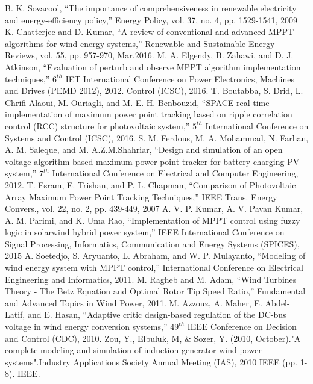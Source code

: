\begin{thebibliography}{}
B. K. Sovacool, “The importance of comprehensiveness in renewable electricity and energy-efficiency policy,” Energy Policy, vol. 37, no. 4, pp. 1529-1541, 2009
K. Chatterjee and D. Kumar, “A review of conventional and advanced MPPT algorithms for wind energy systems,” Renewable and Sustainable Energy Reviews, vol. 55, pp. 957-970, Mar.2016.
M. A. Elgendy, B. Zahawi, and D. J. Atkinson, “Evaluation of perturb and observe MPPT algorithm implementation techniques,” $6^{th}$ IET International Conference on Power Electronics, Machines and Drives (PEMD 2012), 2012. Control (ICSC), 2016.
T. Boutabba, S. Drid, L. Chrifi-Alaoui, M. Ouriagli, and M. E. H. Benbouzid, “SPACE real-time implementation of maximum power point tracking based on ripple correlation control (RCC) structure for photovoltaic system,”  $5^{th}$ International Conference on Systems and Control (ICSC), 2016.
S. M. Ferdous, M. A. Mohammad, N. Farhan, A. M. Saleque, and M. A.Z.M.Shahriar, “Design and simulation of an open voltage algorithm based maximum power point tracker for battery charging PV system,”  $7^{th}$ International Conference on Electrical and Computer Engineering, 2012.
T. Esram, E. Trishan, and P. L. Chapman, “Comparison of Photovoltaic Array Maximum Power Point Tracking Techniques,” IEEE Trans. Energy Convers., vol. 22, no. 2, pp. 439-449, 2007
A. V. P. Kumar, A. V. Pavan Kumar, A. M. Parimi, and K. Uma Rao, “Implementation of MPPT control using fuzzy logic in solarwind hybrid power system,” IEEE International Conference on Signal Processing, Informatics, Communication and Energy Systems (SPICES), 2015 
A. Soetedjo, S. Aryuanto, L. Abraham, and W. P. Mulayanto, “Modeling of wind energy system with MPPT control,”  International Conference on Electrical Engineering and Informatics, 2011.
M. Ragheb and M. Adam, “Wind Turbines Theory - The Betz Equation and Optimal Rotor Tip Speed Ratio,” Fundamental and Advanced Topics in Wind Power, 2011. 
M. Azzouz, A. Maher, E. Abdel-Latif, and E. Hasan, “Adaptive critic design-based regulation of the DC-bus voltage in wind energy conversion systems,” $49^{th}$ IEEE Conference on Decision and Control (CDC), 2010.
Zou, Y., Elbuluk, M, \& Sozer, Y. (2010, October)."A complete modeling and simulation of induction generator wind power systems".Industry Applications Society Annual Meeting (IAS), 2010 IEEE (pp. 1-8). IEEE.

\end{thebibliography}

